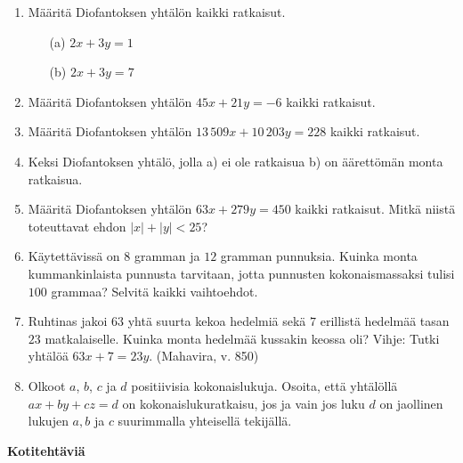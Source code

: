 \begin{enumerate}
\item Määritä Diofantoksen yhtälön kaikki ratkaisut.
\begin{itemize}
\item[(a)] $2x + 3y = 1$
\item[(b)] $2x + 3y = 7$
\end{itemize}

\item Määritä Diofantoksen yhtälön $45x + 21y = -6$ kaikki ratkaisut.

\item Määritä Diofantoksen yhtälön $13\, 509x + 10\, 203y = 228$ kaikki ratkaisut.

\item Keksi Diofantoksen yhtälö, jolla a) ei ole ratkaisua b) on äärettömän monta ratkaisua.

\item Määritä Diofantoksen yhtälön $63x + 279y = 450$ kaikki ratkaisut. Mitkä niistä toteuttavat ehdon $|x| + |y| < 25$?

\item Käytettävissä on $8$ gramman ja $12$ gramman punnuksia. Kuinka monta kummankinlaista punnusta tarvitaan, jotta punnusten kokonaismassaksi tulisi $100$ grammaa? Selvitä kaikki vaihtoehdot. 

\item Ruhtinas jakoi $63$ yhtä suurta kekoa hedelmiä sekä $7$ erillistä hedelmää tasan $23$ matkalaiselle. Kuinka monta hedelmää kussakin keossa oli? Vihje: Tutki yhtälöä $63x + 7 = 23y$. (Mahavira, v. 850)

\item Olkoot $a$, $b$, $c$ ja $d$ positiivisia kokonaislukuja. Osoita, että yhtälöllä $ax+by+cz=d$ on kokonaislukuratkaisu, jos ja vain jos luku $d$ on jaollinen lukujen $a,b$ ja $c$ suurimmalla yhteisellä tekijällä. 

\end{enumerate}

{\bf Kotitehtäviä}

